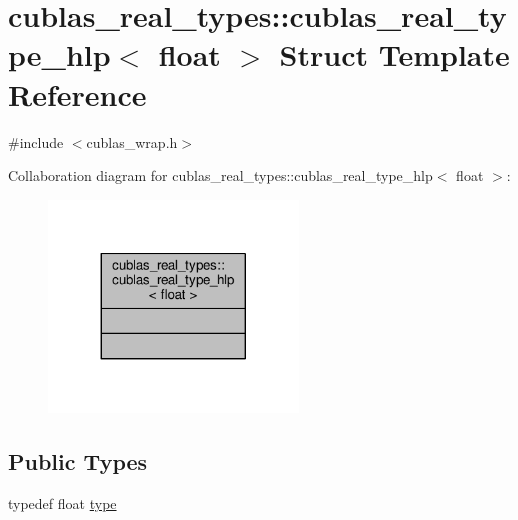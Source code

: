 \hypertarget{structcublas__real__types_1_1cublas__real__type__hlp_3_01float_01_4}{\section{cublas\-\_\-real\-\_\-types\-:\-:cublas\-\_\-real\-\_\-type\-\_\-hlp$<$ float $>$ Struct Template Reference}
\label{structcublas__real__types_1_1cublas__real__type__hlp_3_01float_01_4}
}


{\ttfamily \#include $<$cublas\-\_\-wrap.\-h$>$}



Collaboration diagram for cublas\-\_\-real\-\_\-types\-:\-:cublas\-\_\-real\-\_\-type\-\_\-hlp$<$ float $>$\-:
\nopagebreak
\begin{figure}[H]
\begin{center}
\leavevmode
\includegraphics[width=188pt]{structcublas__real__types_1_1cublas__real__type__hlp_3_01float_01_4__coll__graph}
\end{center}
\end{figure}
\subsection*{Public Types}
\begin{DoxyCompactItemize}
\item 
typedef float \hyperlink{structcublas__real__types_1_1cublas__real__type__hlp_3_01float_01_4_a533275b329463dc04ad57764131bda3e}{type}
\end{DoxyCompactItemize}


